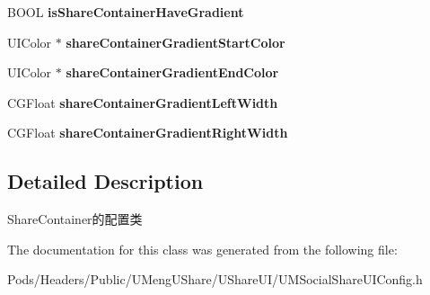 \begin{DoxyCompactItemize}
\mbox{\label{interface_u_m_social_share_container_config_ad843f14868862ef0ada6567282cc0512}} 
B\+O\+OL {\bfseries is\+Share\+Container\+Have\+Gradient}
\item 
\mbox{\label{interface_u_m_social_share_container_config_a66b77ad322224c9f63dbaf79e358c25e}} 
U\+I\+Color $\ast$ {\bfseries share\+Container\+Gradient\+Start\+Color}
\item 
\mbox{\label{interface_u_m_social_share_container_config_ae0dd4035b8ba4523bfba82a9f1e5fb95}} 
U\+I\+Color $\ast$ {\bfseries share\+Container\+Gradient\+End\+Color}
\item 
\mbox{\label{interface_u_m_social_share_container_config_aff7f79116debe51a131fbcf6c4bc9e16}} 
C\+G\+Float {\bfseries share\+Container\+Gradient\+Left\+Width}
\item 
\mbox{\label{interface_u_m_social_share_container_config_ac848eb36490d22f1c86694e26766faed}} 
C\+G\+Float {\bfseries share\+Container\+Gradient\+Right\+Width}
\end{DoxyCompactItemize}


\subsection{Detailed Description}
Share\+Container的配置类 

The documentation for this class was generated from the following file\+:\begin{DoxyCompactItemize}
\item 
Pods/\+Headers/\+Public/\+U\+Meng\+U\+Share/\+U\+Share\+U\+I/U\+M\+Social\+Share\+U\+I\+Config.\+h\end{DoxyCompactItemize}
